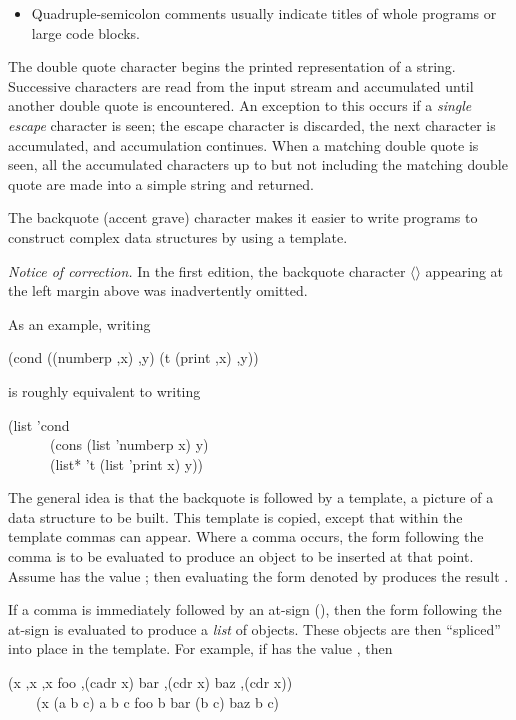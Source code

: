 \begin{flushdesc}
\begin{itemize}
\item
Quadruple-semicolon comments usually indicate titles of whole programs or large code blocks.
\end{itemize}

\item[\cd{"}]
The double quote character begins the printed representation
of a string.
Successive characters are read from the input stream and accumulated until
another double quote is encountered.
An exception to this occurs if a \emph{single escape} character
is seen; the escape character is discarded,
the next character is accumulated, and accumulation
continues.  When a matching double quote is seen, all the accumulated
characters up to but not including the matching double quote are
made into a simple string and returned.

\item[\cd{{\Xbq}}]
The backquote (accent grave) character
makes it easier to write programs to construct complex data structures by
using a template.
\label{BACKQUOTE}
\begin{new}%
\emph{Notice of correction.}
In the first edition, the backquote character $\langle$\cd{\Xbq}$\rangle$
appearing at the left margin above was inadvertently omitted.
\end{new}
As an example, writing
\begin{lisp}
{\Xbq}(cond ((numberp ,x) ,{\Xatsign}y) (t (print ,x) ,{\Xatsign}y))
\end{lisp}
is roughly equivalent to writing
\begin{lisp}
(list 'cond  \\
~~~~~~(cons (list 'numberp x) y)  \\
~~~~~~(list* 't (list 'print x) y))
\end{lisp}
The general idea is that the backquote is followed by a template,
a picture of a data structure to be built.  This template is copied,
except that within the template commas can appear.  Where a comma
occurs, the form following the comma is to be evaluated to produce an object to
be inserted at that point.  Assume  has the value ; then
evaluating the form denoted by  produces
the result .

If a comma is immediately followed by an at-sign (\cd{{\Xatsign}}), then the
form following the at-sign is evaluated to produce a \emph{list} of objects.
These objects are then ``spliced'' into place in the template.  For
example, if  has the value , then
\begin{lisp}
{\Xbq}(x ,x ,{\Xatsign}x foo ,(cadr x) bar ,(cdr x) baz ,{\Xatsign}(cdr x)) \\
~~~\EV\ (x (a b c) a b c foo b bar (b c) baz b c)
\end{lisp}


\end{flushdesc}
